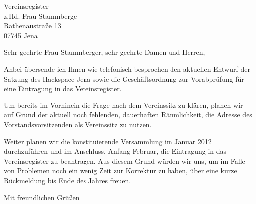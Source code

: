 \documentclass[fontsize=12pt,paper=a4,DIN]{scrlttr2}
\date{7. Dezember 2011}
\begin{document}
\begin{letter}{Vereinsregister \\
	z.Hd. Frau Stammberge \\
	Rathenaustraße 13 \\
	07745 Jena}


\opening{Sehr geehrte Frau Stammberger, sehr geehrte Damen und Herren,}

Anbei übersende ich Ihnen wie telefonisch besprochen den aktuellen
Entwurf der Satzung des Hackspace Jena sowie die Geschäftsordnung
zur Vorabprüfung für eine Eintragung in das Vereinsregi\-ster.

Um bereits im Vorhinein die Frage nach dem Vereinssitz zu klären,
planen wir auf Grund der aktuell noch fehlenden, dauerhaften
Räumlichkeit, die Adresse des Vorstandsvor\-sitz\-enden als Vereinssitz
zu nutzen.

Weiter planen wir die konstituierende Versammlung im Januar 2012
durchzuführen und im Anschluss, Anfang Februar, die Eintragung in
das Vereinsregister zu beantragen. Aus diesem Grund würden wir uns,
um im Falle von Problemen noch ein wenig Zeit zur Korrektur zu haben,
über eine kurze Rückmeldung bis Ende des Jahres freuen.


\closing{Mit freundlichen Grüßen}

\end{letter}
\end{document}
